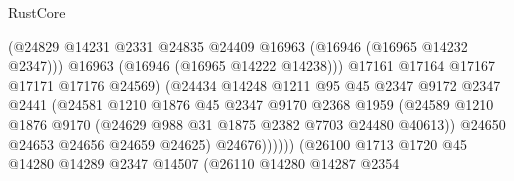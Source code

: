 \begin{lexlean}{RustCore}
\begin{coremodule}
                                          (@24829
                                            @14231
                                            @2331
                                            @24835
                                            @24409
                                            @16963
                                            (@16946 (@16965 @14232 @2347)))
                                          @16963
                                          (@16946 (@16965 @14222 @14238)))
                                        @17161
                                        @17164
                                        @17167
                                        @17171
                                        @17176
                                        @24569)
                                      (@24434
                                        @14248
                                        @1211
                                        @95
                                        @45
                                        @2347
                                        @9172
                                        @2347
                                        @2441
                                        (@24581
                                          @1210
                                          @1876
                                          @45
                                          @2347
                                          @9170
                                          @2368
                                          @1959
                                          (@24589
                                            @1210
                                            @1876
                                            @9170
                                            (@24629 @988 @31 @1875 @2382 @7703 @24480 @40613))
                                          @24650
                                          @24653
                                          @24656
                                          @24659
                                          @24625)
                                        @24676))))))
                            (@26100
                              @1713
                              @1720
                              @45
                              @14280
                              @14289
                              @2347
                              @14507
                              (@26110
                                @14280
                                @14287
                                @2354

\end{coremodule}
\end{lexlean}
